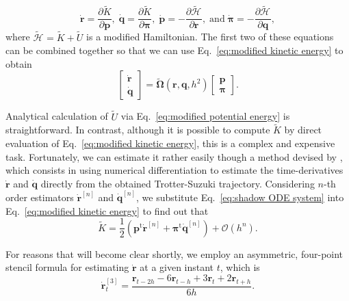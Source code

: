 \documentclass[
journal=jctcce,
layout=twocolumn
]{achemso}
\newcommand{\vt}[1]{\boldsymbol{\mathbf{#1}}}   %
\newcommand{\tr}[1]{#1^\text{t}}                %
\newcommand{\diff}[2]{\frac{\partial #1}{\partial #2}} %
\newcommand{\Ham}[1]{{\mathcal H}_\text{#1}}    %
\newcommand{\timestep}{h}
\newcommand{\modified}[1]{\widetilde{#1}}
\begin{document}
\begin{equation*}
\dot{\vt r} = \diff{\modified K}{\vt p}, \;
\dot{\vt q} = \diff{\modified K}{\vt \pi}, \;
\dot{\vt p} = -\diff{\modified{\Ham{}}}{\vt r}, \; \text{and} \;
\dot{\vt \pi} = -\diff{\modified{\Ham{}}}{\vt q},
\end{equation*}
where $\modified{\Ham{}} = \modified K + \modified U$ is a modified Hamiltonian.
The first two of these equations can be combined together so that we can use Eq.~\eqref{eq:modified kinetic energy} to obtain
\begin{equation}
\label{eq:shadow ODE system}
\left[\begin{array}{c} \dot{\vt r} \\ \dot{\vt q} \end{array}\right] = \modified{\mathbf \Omega}(\vt r, \vt q, \timestep^2) \left[\begin{array}{c} \vt p \\ \vt \pi \end{array}\right].
\end{equation}

Analytical calculation of $\modified U$ via Eq.~\eqref{eq:modified potential energy} is straightforward.
In contrast, although it is possible to compute $\modified K$ by direct evaluation of Eq.~\eqref{eq:modified kinetic energy}, this is a complex and expensive task.
Fortunately, we can estimate it rather easily though a method devised by \citeauthor{Eastwood_2010} \cite{Eastwood_2010}, which consists in using numerical differentiation to estimate the time-derivatives $\dot{\vt r}$ and $\dot{\vt q}$ directly from the obtained Trotter-Suzuki trajectory.
Considering $n$-th order estimators $\dot{\vt r}^{[n]}$ and $\dot{\vt q}^{[n]}$, we substitute Eq.~\eqref{eq:shadow ODE system} into Eq.~\eqref{eq:modified kinetic energy} to find out that
\begin{equation}
\label{eq:modified kinetic energy estimator}
\modified K = \frac{1}{2} \left( \tr{\vt p} \dot{\vt r}^{[n]} + \tr{\vt \pi} \dot{\vt q}^{[n]} \right) + \mathcal{O}(h^n).
\end{equation}

For reasons that will become clear shortly, we employ an asymmetric, four-point stencil formula for estimating $\dot{\vt r}$ at a given instant $t$, which is
\begin{equation*}
\dot{\vt r}^{[3]}_t = \frac{{\vt r}_{t-2\timestep} - 6 {\vt r}_{t-\timestep} + 3 {\vt r}_t + 2 {\vt r}_{t+\timestep}}{6\timestep}.
\end{equation*}
\end{document}

